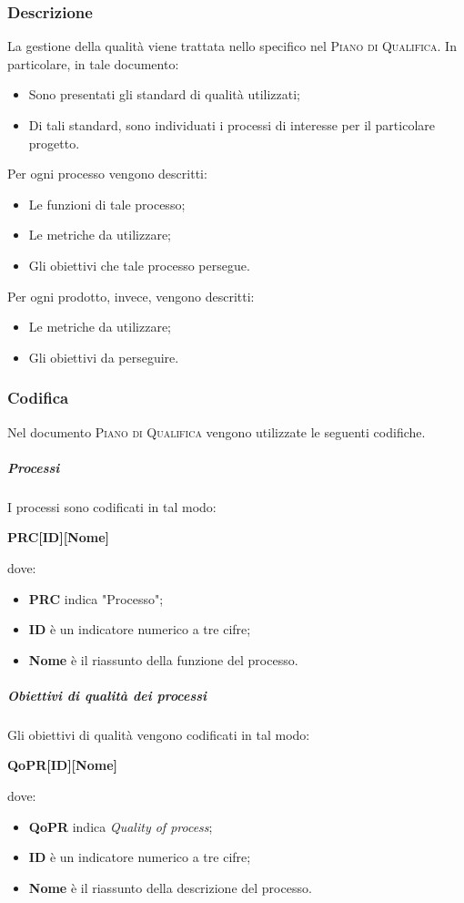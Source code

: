 \documentclass[../norme-di-progetto.tex]{subfiles}
\begin{document}
\subsubsection{Descrizione}
La gestione della qualità viene trattata nello specifico nel \textsc{Piano di Qualifica}. In particolare, in tale documento:
\begin{itemize}
  \item Sono presentati gli standard di qualità utilizzati;
  \item Di tali standard, sono individuati i processi di interesse per il particolare progetto.
\end{itemize}
Per ogni processo vengono descritti:
\begin{itemize}
  \item Le funzioni di tale processo;
  \item Le metriche da utilizzare;
  \item Gli obiettivi che tale processo persegue.
\end{itemize}
Per ogni prodotto, invece, vengono descritti:
\begin{itemize}
  \item Le metriche da utilizzare;
  \item Gli obiettivi da perseguire.
\end{itemize}
\subsubsection{Codifica}
Nel documento \textsc{Piano di Qualifica} vengono utilizzate le seguenti codifiche.
\subparagraph*{Processi}
I processi sono codificati in tal modo: \\
\begin{center}
  \centering
  \textbf{PRC[ID][Nome]}
\end{center} dove:
\begin{itemize}
  \item \textbf{PRC} indica "Processo";
  \item \textbf{ID} è un indicatore numerico a tre cifre;
  \item \textbf{Nome} è il riassunto della funzione del processo.
\end{itemize}

\subparagraph*{Obiettivi di qualità dei processi}
Gli obiettivi di qualità vengono codificati in tal modo: \\
\begin{center}
  \centering
  \textbf{QoPR[ID][Nome]}
\end{center} dove:
\begin{itemize}
  \item \textbf{QoPR} indica \textit{Quality of process};
  \item \textbf{ID} è un indicatore numerico a tre cifre;
  \item \textbf{Nome} è il riassunto della descrizione del processo.
\end{itemize}
\end{document}

